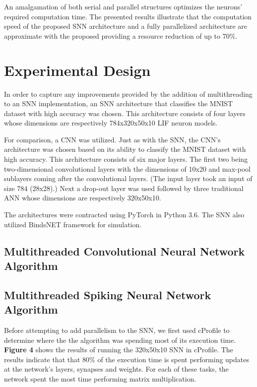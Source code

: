 \documentclass[journal]{IEEEtran}
\begin{document}
An amalgamation of both serial and parallel structures optimizes the neurons' required computation time. The presented results illustrate that the computation speed of the proposed SNN architecture and a fully parallelized architecture are approximate with the proposed providing a resource reduction of up to 70\%.

\section{Experimental Design}
In order to capture any improvements provided by the addition of multithreading to an SNN implementation, an SNN architecture that classifies the MNIST dataset with high accuracy was chosen. This architecture consists of four layers whose dimensions are respectively 784x320x50x10 LIF neuron models. 
\par
For comparison, a CNN was utilized. Just as with the SNN, the CNN's architecture was chosen based on its ability to classify the MNIST dataset with high accuracy. This architecture consists of six major layers. The first two being two-dimensional convolutional layers with the dimensions of 10x20 and max-pool sublayers coming after the convolutional layers. (The input layer took an input of size 784 (28x28).) Next a drop-out layer was used followed by three traditional ANN whose dimensions are respectively 320x50x10.
\par
The architectures were contracted using PyTorch in Python 3.6. The SNN also utilized BindsNET framework for simulation. 
\subsection{Multithreaded Convolutional Neural Network Algorithm}

\subsection{Multithreaded Spiking Neural Network Algorithm}

Before attempting to add parallelism to the SNN, we first used cProfile to determine where the the algorithm was spending most of its execution time. \textbf{Figure 4} shows the results of running the 320x50x10 SNN in cProfile. The results indicate that that 80\% of the execution time is spent performing updates at the network's layers, synapses and weights. For each of these tasks, the network spent the most time performing matrix multiplication.
\end{document}
